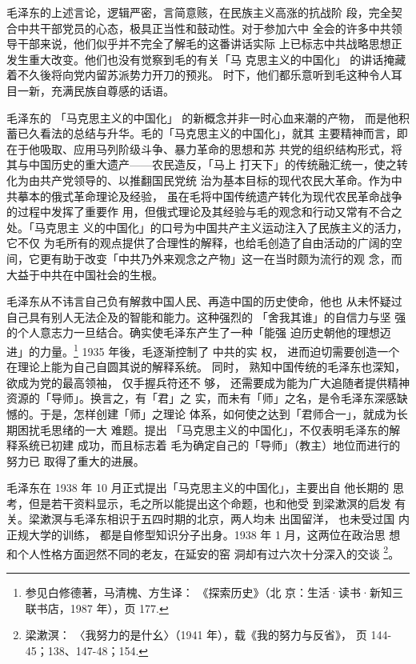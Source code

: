 毛泽东的上述言论，逻辑严密，言简意赅，在民族主义高涨的抗战阶
段，完全契合中共干部党员的心态，极具正当性和鼓动性。对于参加六中
全会的许多中共领导干部来说，他们似乎并不完全了解毛的这番讲话实际
上已标志中共战略思想正发生重大改变。他们也没有觉察到毛的有关「马
克思主义的中国化」
的讲话掩藏着不久後将向党内留苏派势力开刀的预兆。
时下，他们都乐意听到毛这种令人耳目一新，充满民族自尊感的话语。

毛泽东的
「马克思主义的中国化」
的新概念并非一时心血来潮的产物，
而是他积蓄已久看法的总结与升华。毛的「马克思主义的中国化」，就其
主要精神而言，即在于他吸取、应用马列阶级斗争、暴力革命的思想和苏
共党的组织结构形式，将其与中国历史的重大遗产——农民造反，「马上
打天下」的传统融汇统一，使之转化为由共产党领导的、以推翻国民党统
治为基本目标的现代农民大革命。作为中共摹本的俄式革命理论及经验，
虽在毛将中国传统遗产转化为现代农民革命战争的过程中发挥了重要作
用，但俄式理论及其经验与毛的观念和行动又常有不合之处。「马克思主
义的中国化」的口号为中国共产主义运动注入了民族主义的活力，它不仅
为毛所有的观点提供了合理性的解释，也给毛创造了自由活动的广阔的空
间，它更有助于改变「中共乃外来观念之产物」这一在当时颇为流行的观
念，而大益于中共在中国社会的生根。

毛泽东从不讳言自己负有解救中国人民、再造中国的历史使命，他也 从未怀疑过
自己具有别人无法企及的智能和能力。这种强烈的 「舍我其谁」的自信力与坚
强的个人意志力一旦结合。确实使毛泽东产生了一种「能强 迫历史朝他的理想迈
进」的力量。\footnote{参见白修德著，马清槐、方生译： 《探索历史》（北
京：生活·读书·新知三联书店，1987 年），页 177.} 1935 年後，毛逐渐控制了
中共的实 权， 进而迫切需要创造一个在理论上能为自己自圆其说的解释系统。
同时， 熟知中国传统的毛泽东也深知， 欲成为党的最高领袖， 仅手握兵符还不
够， 还需要成为能为广大追随者提供精神资源的「导师」。换言之，有「君」之
实，而未有「师」之名，是令毛泽东深感缺憾的。于是，怎样创建「师」之理论
体系，如何使之达到「君师合一」，就成为长期困扰毛思绪的一大 难题。提出
「马克思主义的中国化」，不仅表明毛泽东的解释系统已初建 成功，而且标志着
毛为确定自己的「导师」（教主）地位而进行的努力已 取得了重大的进展。

毛泽东在 1938 年 10 月正式提出「马克思主义的中国化」，主要出自 他长期的
思考，但是若干资料显示，毛之所以能提出这个命题，也和他受 到梁漱溟的启发
有关。梁漱溟与毛泽东相识于五四时期的北京，两人均未 出国留洋， 也未受过国
内正规大学的训练， 都是自修型知识分子出身。1938 年 1 月，这两位在政治思
想和个人性格方面迥然不同的老友，在延安的窑 洞却有过六次十分深入的交谈
\footnote{梁漱溟： 〈我努力的是什幺〉（1941 年），载《我的努力与反省》，
页 144-45；138、147-48；154.}。

